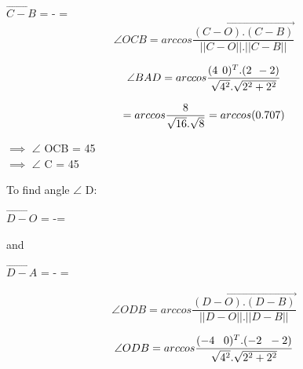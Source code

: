 \documentclass[journal,10pt,twocolumn]{article}
\begin{document}
$\vec{C-B}$ = -  = 
\\

\begin{equation}
\angle OCB = arccos \vec{\frac{(C-O).(C-B)}{||C-O ||. ||C-B||}}
\end{equation}

\begin{equation}
\angle BAD = arccos \frac{(4 \hspace{0.15cm} 0)^T . (2 \hspace{0.15cm} -2) } {\sqrt{4^2}.\sqrt{2^2+2^2}}
\end{equation}

\begin{equation}
= arccos \frac{8 } {\sqrt{16}.\sqrt{8}} = arccos (0.707)
\\
\end{equation}
\begin{flushleft}
$\implies$   $\angle$ OCB = 45 \textdegree\\
\vspace{0.3cm}
$\implies$   $\angle$ C = 45 \textdegree
\end{flushleft}

\vspace{0.5cm}
\begin{flushleft}
To find angle $\angle$ D: \\
\end{flushleft}
\vspace{0.2cm}
\center
$\vec{D-O}$ = -= 
\\
\endcenter
\begin{flushleft}
and \\
\end{flushleft}


$\vec{D-A}$ =  - = 

\endcenter

\begin{equation}
\angle ODB = arccos \vec{\frac{(D-O).(D-B)}{||D-O ||. ||D-B||}}
\end{equation}

\begin{equation}
\angle ODB = arccos \frac{(-4 \hspace{0.29cm} 0)^T .(-2 \hspace{0.22cm} -2)}{\sqrt{4^2}.\sqrt{2^2+2^2} }
\end{equation}
\end{document}

